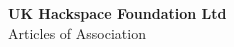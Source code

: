 

\begin{titlepage}
\begin{center}
{\bf \LARGE UK Hackspace Foundation Ltd}\\[36pt]
{\Large Articles of Association}

\vfill

\end{center}
\end{titlepage}
\tableofcontents


